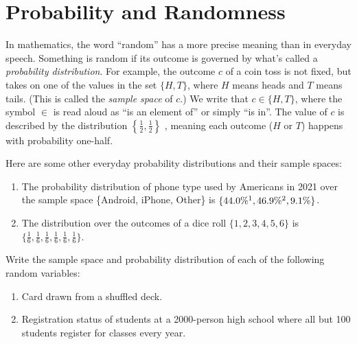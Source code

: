 \section{Probability and Randomness}\label{sec:prob}

In mathematics, the word ``random'' has a more precise meaning than in everyday 
speech. Something is random if its outcome is governed by what's called a 
\emph{probability distribution}. 
For example, the outcome $c$ of a coin toss is not fixed, but takes 
on one of the values in the set $\{H, T\}$, where $H$ means heads and $T$ means 
tails. (This is called the \emph{sample space} of $c$.) We write 
that $c \in \{H,T\}$, where the symbol $\in$ is read aloud as 
``is an element of'' or simply ``is in''.
The value of $c$ is described by the distribution $\left\{\frac{1}{2}, 
\frac{1}{2}\right\}$ , meaning each outcome ($H$ or $T$) happens with 
probability one-half.

\begin{example}\label{ex:prob-dist}
    Here are some other everyday probability distributions and their 
    sample spaces:
    \renewcommand{\labelenumi}{(\alph{enumi})} 
    \begin{enumerate}
        \item The probability distribution of phone type used by Americans 
        in 2021 over the sample space \{Android, iPhone, Other\} is $\{44.0\%\footnotemark[1],
        46.9\%\footnotemark[2],9.1\%\}$.
        \item The distribution over the outcomes of a dice roll $\{1,2,3,4,5,6\}$
        is $\{\frac{1}{6},\frac{1}{6},\frac{1}{6},\frac{1}{6},\frac{1}{6},\frac{1}{6}\}$.
    \end{enumerate}
\end{example}

\begin{exercise}
    Write the sample space and probability distribution of each of 
    the following random variables:
    \renewcommand{\labelenumi}{(\alph{enumi})} 
    \begin{enumerate}
        \item Card drawn from a shuffled deck.
        \item Registration status of students at a 2000-person high school 
        where all but 100 students register for classes every year.
    \end{enumerate}
\end{exercise}


